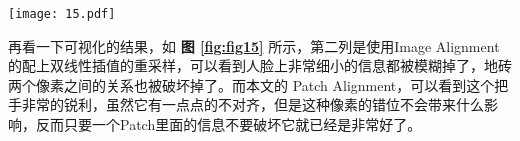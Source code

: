 \begin{figure*}[!tbp]
	\centering
	\texttt{[image: 15.pdf]}
	\caption{Image Alignment 和 Patch Alignment可视化结果}
	\label{fig:fig15}
\end{figure*}

再看一下可视化的结果，如 \textbf{图 \ref{fig:fig15}} 所示，第二列是使用Image Alignment的配上双线性插值的重采样，可以看到人脸上非常细小的信息都被模糊掉了，地砖两个像素之间的关系也被破坏掉了。而本文的 Patch Alignment，可以看到这个把手非常的锐利，虽然它有一点点的不对齐，但是这种像素的错位不会带来什么影响，反而只要一个Patch里面的信息不要破坏它就已经是非常好了。
